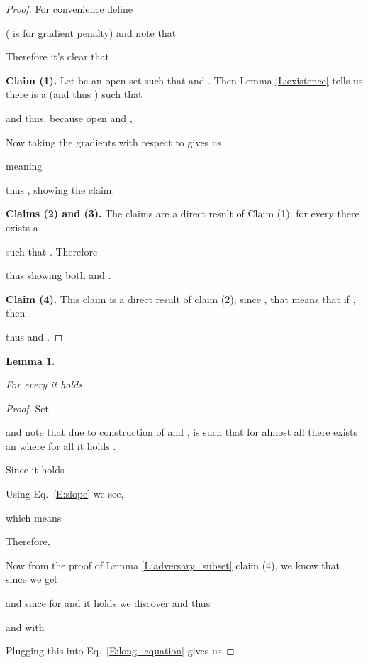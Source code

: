 \documentclass{article}
\newtheorem{lemma}{Lemma}
\begin{document}
\begin{proof}
For convenience define

( is for gradient penalty) and note that

Therefore it's clear that 

\noindent\textbf{Claim (1). }
Let  be an open set such that  and .
Then Lemma \ref{L:existence} tells us there is a  (and thus ) such that

and thus, because  open and ,

Now taking the gradients with respect to  gives us

meaning

thus , showing the claim.

\noindent\textbf{Claims (2) and (3). }
The claims are a direct result of Claim (1);
for every  there exists a

such that . Therefore

thus showing both  and .

\noindent\textbf{Claim (4). }
This claim is a direct result of claim (2); since ,
that means that if , then

thus  and .
\end{proof}

\begin{lemma}\label{L:first_order_helper}


For every  it holds





\end{lemma}

\begin{proof}
 Set

and note that due to construction of  and ,  is such that for almost all  there exists an
 where for all  it holds .

Since  it holds

Using Eq.\ \ref{E:slope} we see,

which means

Therefore,

Now from the proof of Lemma \ref{L:adversary_subset} claim (4), we know that since  we get

and since for  and  it holds  we discover
 and thus

and with 

Plugging this into Eq.\ \ref{E:long_equation} gives us

\end{proof}
\end{document}
